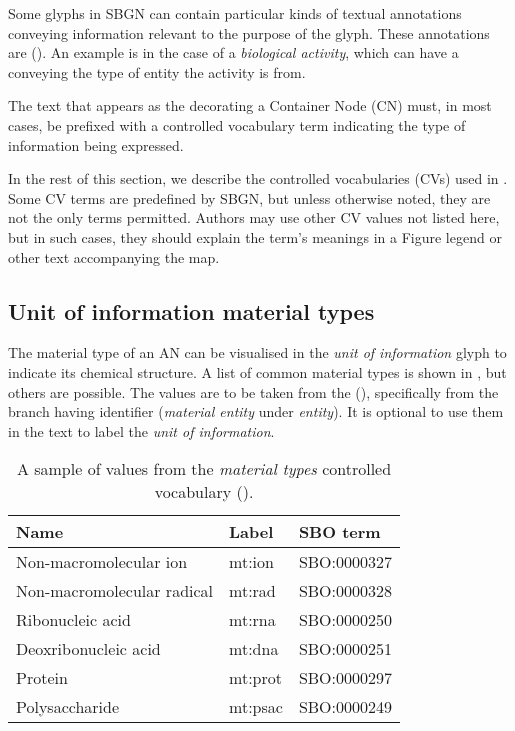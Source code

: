 
\normalcolor

Some glyphs in SBGN \AF can contain particular kinds of textual annotations conveying information relevant to the purpose of the glyph.  These annotations are  ().  An example is in the case of a \emph{biological activity}, which can have a  conveying the type of entity the activity is from.

The text that appears as the  decorating a Container Node (CN) must, in most cases, be prefixed with a controlled vocabulary term indicating the type of information being expressed.

In the rest of this section, we describe the controlled vocabularies (CVs) used in \SBGNAFLone. Some CV terms are predefined by SBGN, but unless otherwise noted, they are not the only terms permitted. Authors may use other CV values not listed here, but in such cases, they should explain the term's meanings in a Figure legend or other text accompanying the map.

\subsection{Unit of information material types}
\label{sec:af:material-types-cv}

The material type of an AN can be visualised in the \emph{unit of information} glyph to indicate its chemical structure.  A list of common material types is shown in , but others are possible. The values are to be taken from the \sbo (\sbourl), specifically from the branch having identifier  ($\!$\emph{material entity} under \emph{entity}). It is optional to use them in the text to label the \emph{unit of information}. 

\begin{table}[!ht]
  \centering
  \begin{tabular}{l>{\ttfamily}l>{\ttfamily}l}
    \toprule
    \textbf{Name}              & \textbf{\rmfamily Label} & \textbf{\rmfamily SBO term} \\
    \midrule
    Non-macromolecular ion     & mt:ion  & SBO:0000327\\
    Non-macromolecular radical & mt:rad  & SBO:0000328\\
    Ribonucleic acid           & mt:rna  & SBO:0000250\\
    Deoxribonucleic acid       & mt:dna  & SBO:0000251\\
    Protein                    & mt:prot & SBO:0000297\\
    Polysaccharide             & mt:psac & SBO:0000249\\
    \bottomrule
  \end{tabular}
  \caption{A sample of values from the \emph{material types} controlled
    vocabulary ().}
  \label{tab:af:material-types-cv}
\end{table}

